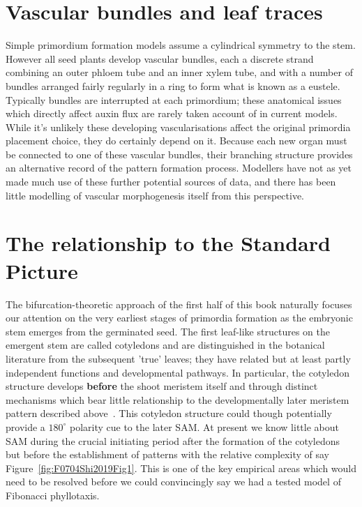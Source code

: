 \section{Vascular bundles and leaf traces}
Simple primordium formation models assume a cylindrical symmetry to the stem. However all seed plants develop vascular bundles, each a discrete strand combining an outer phloem tube and an inner xylem tube, and with a number of bundles arranged fairly regularly in a ring to form what is known as a eustele. Typically bundles are interrupted at each primordium; these anatomical issues which directly affect auxin flux are rarely taken account of in current models. While it's unlikely these developing vascularisations affect the original primordia placement choice, they do certainly depend on it. Because each new organ must be connected to one of these vascular bundles, their branching structure provides an alternative record of the pattern formation process. 
Modellers have not as yet made much use of these further potential sources of data, and  there has been little modelling of vascular morphogenesis itself from this perspective.
	


\section{The relationship to the Standard Picture}
\label{sec:jugacy}
The bifurcation-theoretic approach of the first half of this book naturally focuses our attention on the very earliest stages of primordia formation as the embryonic stem emerges from the germinated seed.  The first leaf-like structures on the emergent stem are called cotyledons and are distinguished in the botanical literature from the subsequent 'true' leaves; they have related but at least partly independent functions and developmental pathways. In particular, the cotyledon structure develops \textbf{before} the shoot meristem itself and through distinct mechanisms which bear little relationship to the developmentally later meristem pattern described above~\autocite{yoshidaGeneticControlPlant2014}. This cotyledon structure could though potentially provide a $180^\circ$ polarity cue to the later SAM. At present we know  little about SAM during the crucial initiating period after the formation of the cotyledons but before the establishment of patterns with the relative complexity of say Figure~\ref{fig:F0704Shi2019Fig1}. This is one of the key empirical areas which would need to be resolved before we could convincingly say we had a tested model of Fibonacci phyllotaxis. 

